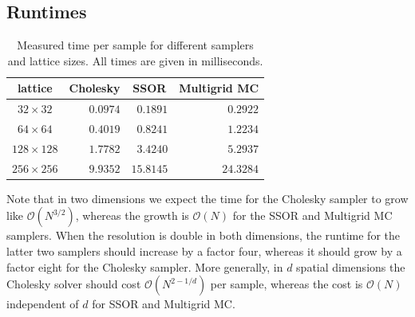 \documentclass[11pt]{article}
\begin{document}
\subsection{Runtimes}
\begin{table}
    \begin{center}
        \begin{tabular}{crrr}
            \hline
            lattice         & \multicolumn{1}{c}{Cholesky} & \multicolumn{1}{c}{SSOR} & \multicolumn{1}{c}{Multigrid MC} \\
            \hline\hline
            $32\times 32$   & $0.0974$                     & $0.1891$                 & $0.2922$                         \\
            $64\times 64$   & $0.4019$                     & $0.8241$                 & $1.2234$                         \\
            $128\times 128$ & $1.7782$                    & $3.4240$                 & $5.2937$                         \\
            $256\times 256$ & $9.9352$                   & $15.8145$                 & $24.3284$                        \\
            \hline
        \end{tabular}
        \caption{Measured time per sample for different samplers and lattice sizes. All times are given in milliseconds.}
        \label{tab:runtimes}
    \end{center}
\end{table}
Note that in two dimensions we expect the time for the Cholesky sampler to grow like $\mathcal{O}(N^{3/2})$, whereas the growth is $\mathcal{O}(N)$ for the SSOR and Multigrid MC samplers. When the resolution is double in both dimensions, the runtime for the latter two samplers should increase by a factor four, whereas it should grow by a factor eight for the Cholesky sampler. More generally, in $d$ spatial dimensions the Cholesky solver should cost $\mathcal{O}(N^{2-1/d})$ per sample, whereas the cost is $\mathcal{O}(N)$ independent of $d$ for SSOR and Multigrid MC.
\end{document}
